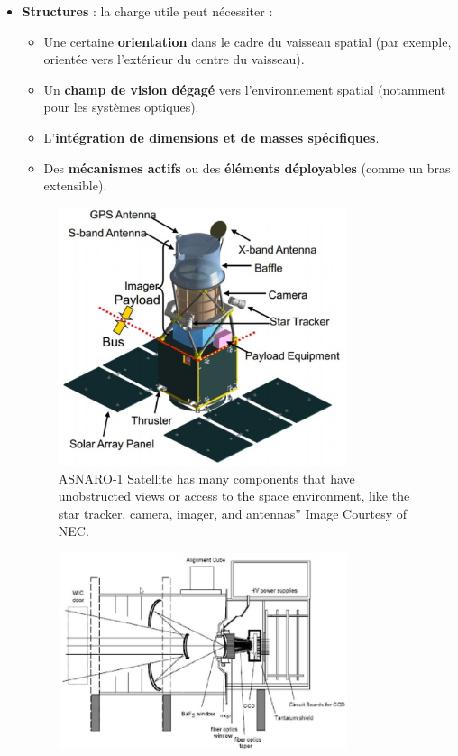 \begin{itemize}
    \item \textbf{Structures} : 
    la charge utile peut nécessiter :
    \begin{itemize}
        \item Une certaine \textbf{orientation} dans le cadre du vaisseau spatial (par exemple, orientée vers l'extérieur du centre du vaisseau).  
        \item Un \textbf{champ de vision dégagé} vers l’environnement spatial (notamment pour les systèmes optiques).  
        \item L’\textbf{intégration de dimensions et de masses spécifiques}.  
        \item Des \textbf{mécanismes actifs} ou des \textbf{éléments déployables} (comme un bras extensible).  
    \end{itemize}
		\begin{figure}
    			\centering
    			\includegraphics[width=0.8\textwidth]{figures/3.17.jpg}
    			\caption{ASNARO-1 Satellite has many components that have unobstructed views or access to the space environment, like the star tracker, 					camera, imager, and antennas” Image Courtesy of NEC.}
    			\label{fig:communication2}
			\end{figure}
    	\begin{figure}[H]
    		\centering
    		\includegraphics[width=0.8\textwidth]{figures/3.18.jpg}

\end{figure}
\end{itemize}
